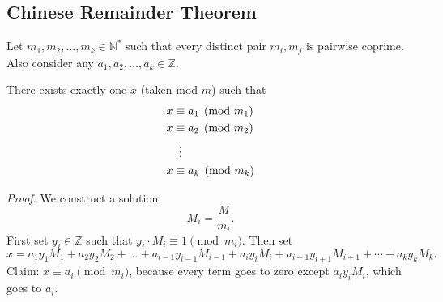 \documentclass{article}
\begin{document}
    
    

\subsection*{Chinese Remainder Theorem}
    Let $m_{1}, m_{2}, \dots, m_{k} \in \mathbb{N}^{*}$ such that every distinct pair $m_{i}, m_{j}$ is pairwise coprime. Also consider any $a_{1}, a_{2}, \dots, a_{k} \in \mathbb{Z}$.
    
    There exists exactly one $x$ (taken mod $m$) such that 
    \begin{align*}
        x &\equiv a_{1} \pmod{m_{1}} \\
        x &\equiv a_{2} \pmod{m_{2}} \\
        &\vdotswithin{ = } \\
        x &\equiv a_{k} \pmod{m_{k}}
    \end{align*}
    
    \textit{Proof. } We construct a solution $$M_{i} = \frac{M}{m_{i}}.$$ First set $y_{i} \in \mathbb{Z}$ such that $y_{i} \cdot M_{i} \equiv 1 \pmod{m_{i}}$.
    Then set $$x = a_{1}y_{1}M_{1} + a_{2}y_{2}M_{2} + \dots + a_{i - 1}y_{i - 1}M_{i - 1} + a_{i}y_{i}M_{i} + a_{i + 1}y_{i + 1}M_{i + 1} + \cdots + a_{k}y_{k}M_{k}.$$
    Claim: $x \equiv a_{i} \pmod{m_{i}}$, because every term goes to zero except $a_{i}y_{i}M_{i}$, which goes to $a_{i}$.
    
\end{document}

